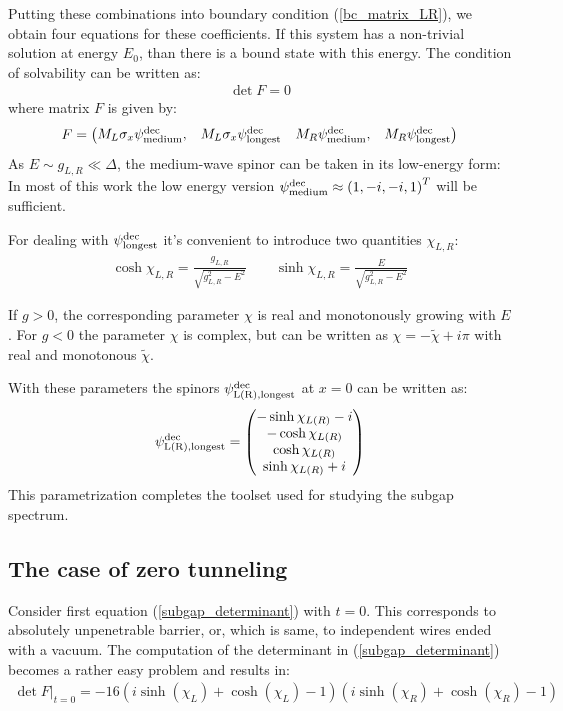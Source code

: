  Putting these combinations into boundary condition (\ref{bc_matrix_LR}), we obtain four equations for these coefficients. If this system has a non-trivial solution at energy $ E_0 $, than there is a bound state with this energy. The condition of solvability can be written as:
\begin{gather}
\label{subgap_determinant}
	\det F = 0
\end{gather}
where matrix $ F $ is given by:
\begin{gather}
F
=
	\begin{pmatrix}
	M_L \sigma_x 
	\wf{dec}{\medium}
	,
	&
	M_L 
	\sigma_x
	\wf{dec}{\verylong}
	&
	M_R
	\wf{dec}{\medium},
	&
	M_R
	\wf{dec}{\verylong}
	\end{pmatrix}
\end{gather}
As $ E\sim g_{L,R}\ll\Delta $, the medium-wave spinor can be taken in its low-energy form: 
In most of this work the low energy version $\wf{dec}{\medium}\approx
\br{
	1,
	- i,
	- i,
	1
}^T
 $
will be sufficient.

For dealing with $ \wf{dec}{\verylong} $ it's convenient to introduce two quantities $ \chi_{L,R} $:
\begin{gather}
\cosh\chi_{L,R}
=
\frac{g_{L,R}}{\sqrt{g^2_{L,R}-E^2}}
\qquad
\sinh\chi_{L,R}
=
\frac{E}{\sqrt{g^2_{L,R}-E^2}}
\end{gather}

If $ g>0 $, the corresponding parameter $ \chi $ is real and monotonously growing with $ E $. For $ g<0 $ the parameter $ \chi $ is complex, but can be written as $ \chi=-\tilde{\chi}+i\pi $ with real and monotonous $\tilde{\chi}  $.

With these parameters the spinors $ \wf{dec}{L\br{R},\verylong} $ at $ x=0 $ can be written as:
\begin{gather}
\wf{dec}{L\br{R},\verylong}
=
	\begin{pmatrix}
	-\sinh \chi_{L\br{R}} -i
	\\
	-\cosh \chi_{L\br{R}}
	\\
	\cosh \chi_{L\br{R}}
	\\
	\sinh \chi_{L\br{R}} +i
	\end{pmatrix}
\end{gather}
This parametrization completes the toolset used for studying the subgap spectrum.

\subsection{The case of zero tunneling}
\label{subsect:zero_tunnel}
Consider first  equation (\ref{subgap_determinant}) with $ t=0 $. This corresponds to absolutely unpenetrable barrier, or, which is same, to independent wires ended with a vacuum. The computation of the determinant in (\ref{subgap_determinant}) becomes a rather easy problem and results in:
\begin{gather}
\label{det_bound_States_zero_t}
	\det F
	\Big|_{t=0}
	=
	-16 \left(i \sinh \left(\chi _L\right)+\cosh \left(\chi _L\right)-1\right) \left(i \sinh \left(\chi _R\right)+\cosh \left(\chi _R\right)-1\right)
\end{gather}


